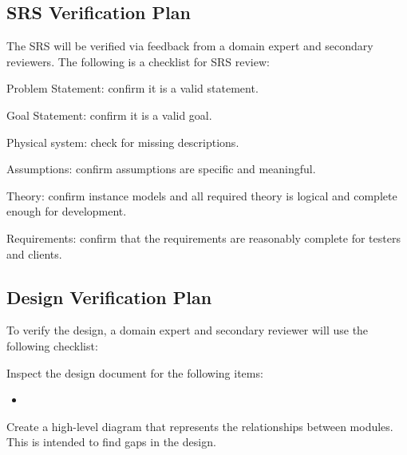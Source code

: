\documentclass[12pt, titlepage]{article}
\begin{document}

\subsection{SRS Verification Plan}

The SRS \citep{SRS} will be verified via feedback from a domain expert and secondary reviewers. The
following is a checklist for SRS review:

\begin{todolist}
    \item Problem Statement: confirm it is a valid statement.
    \item Goal Statement: confirm it is a valid goal.
    \item Physical system: check for missing descriptions.
    \item Assumptions: confirm assumptions are specific and meaningful.
    \item Theory: confirm instance models and all required theory is logical and complete enough for
    development.
    \item Requirements: confirm that the requirements are reasonably complete for testers and
    clients.
\end{todolist}




\subsection{Design Verification Plan}

To verify the design, a domain expert and secondary reviewer will use the following checklist:

\begin{todolist}
    \item Inspect the design document for the following items:
    \begin{itemize}
        \item 
    \end{itemize}
    \item Create a high-level diagram that represents the relationships between modules. This is
    intended to find gaps in the design.
\end{todolist}
\end{document}
